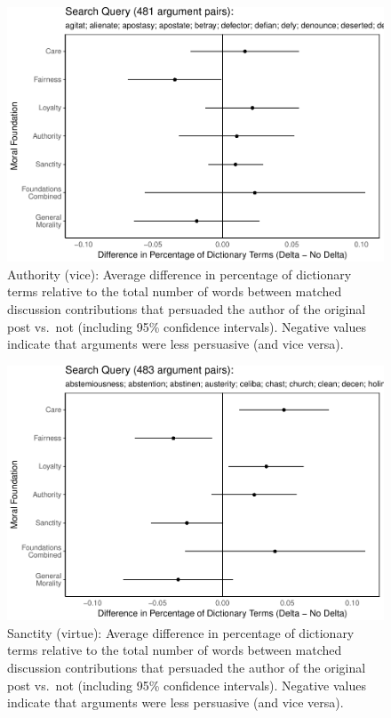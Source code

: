 \documentclass[12pt,]{article}
\begin{document}
\begin{figure}
\centering
\includegraphics{prelim_files/figure-latex/authority vice-1.pdf}
\caption{Authority (vice): Average difference in percentage of
dictionary terms relative to the total number of words between matched
discussion contributions that persuaded the author of the original post
vs.~not (including 95\% confidence intervals). Negative values indicate
that arguments were less persuasive (and vice versa).}
\end{figure}

\begin{figure}
\centering
\includegraphics{prelim_files/figure-latex/purity virtue-1.pdf}
\caption{Sanctity (virtue): Average difference in percentage of
dictionary terms relative to the total number of words between matched
discussion contributions that persuaded the author of the original post
vs.~not (including 95\% confidence intervals). Negative values indicate
that arguments were less persuasive (and vice versa).}
\end{figure}
\end{document}
